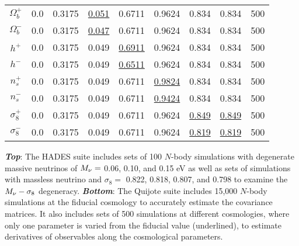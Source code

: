 \begin{table}
\begin{center}
\begin{tabular}{ccccccccc}
    $\Omega_b^+$    & 0.0   & 0.3175 & \underline{0.051} & 0.6711 & 0.9624 & 0.834 & 0.834 & 500 \\ 
    $\Omega_b^-$    & 0.0   & 0.3175 & \underline{0.047} & 0.6711 & 0.9624 & 0.834 & 0.834 & 500 \\ 
    $h^+$           & 0.0   & 0.3175 & 0.049 & \underline{0.6911} & 0.9624 & 0.834 & 0.834 & 500 \\ 
    $h^-$           & 0.0   & 0.3175 & 0.049 & \underline{0.6511} & 0.9624 & 0.834 & 0.834 & 500 \\ 
    $n_s^+$         & 0.0   & 0.3175 & 0.049 & 0.6711 & \underline{0.9824} & 0.834 & 0.834 & 500 \\ 
    $n_s^-$         & 0.0   & 0.3175 & 0.049 & 0.6711 & \underline{0.9424} & 0.834 & 0.834 & 500 \\ 
    $\sigma_8^+$    & 0.0   & 0.3175 & 0.049 & 0.6711 & 0.9624 & \underline{0.849} & \underline{0.849} & 500 \\ 
    $\sigma_8^-$    & 0.0   & 0.3175 & 0.049 & 0.6711 & 0.9624 & \underline{0.819} & \underline{0.819} & 500 \\[3pt]
    \hline
\end{tabular} \label{tab:sims}
\end{center}
    {\bf \em Top}: The HADES suite includes sets of 100 $N$-body simulations with degenerate massive neutrinos 
    of $M_\nu = $ 0.06, 0.10, and 0.15 eV as well as sets of simulations with massless neutrino and 
    $\sigma_8 = $ 0.822, 0.818, 0.807, and 0.798 to examine the $M_\nu-\sigma_8$ degeneracy. 
    {\bf \em Bottom}: The Quijote suite includes 15,000 $N$-body simulations at the fiducial 
    cosmology to accurately estimate the covariance matrices. It also includes sets of 500 
    simulations at different cosmologies, where only one parameter is varied from the fiducial 
    value (underlined), to estimate derivatives of observables along the cosmological parameters.
\end{table}
